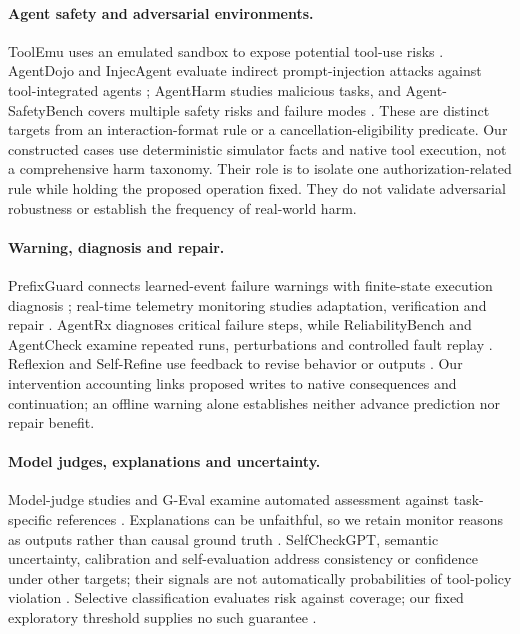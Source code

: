 \documentclass[10pt]{article}
\begin{document}
\paragraph{Agent safety and adversarial environments.}
ToolEmu uses an emulated sandbox to expose potential tool-use risks \citep{ruan2023toolemu}. AgentDojo and InjecAgent evaluate indirect prompt-injection attacks against tool-integrated agents \citep{debenedetti2024agentdojo,zhan2024injecagent}; AgentHarm studies malicious tasks, and Agent-SafetyBench covers multiple safety risks and failure modes \citep{andriushchenko2024agentharm,zhang2024agentsafety}. These are distinct targets from an interaction-format rule or a cancellation-eligibility predicate. Our constructed cases use deterministic simulator facts and native tool execution, not a comprehensive harm taxonomy. Their role is to isolate one authorization-related rule while holding the proposed operation fixed. They do not validate adversarial robustness or establish the frequency of real-world harm.

\paragraph{Warning, diagnosis and repair.}
PrefixGuard connects learned-event failure warnings with finite-state execution diagnosis \citep{huang2026prefix}; real-time telemetry monitoring studies adaptation, verification and repair \citep{dubey2026monitor}. AgentRx diagnoses critical failure steps, while ReliabilityBench and AgentCheck examine repeated runs, perturbations and controlled fault replay \citep{barke2026agentrx,reliability2026,mazumder2026agentcheck}. Reflexion and Self-Refine use feedback to revise behavior or outputs \citep{shinn2023reflexion,madaan2023selfrefine}. Our intervention accounting links proposed writes to native consequences and continuation; an offline warning alone establishes neither advance prediction nor repair benefit.

\paragraph{Model judges, explanations and uncertainty.}
Model-judge studies and G-Eval examine automated assessment against task-specific references \citep{zheng2023judge,liu2023geval}. Explanations can be unfaithful, so we retain monitor reasons as outputs rather than causal ground truth \citep{turpin2023unfaithful}. SelfCheckGPT, semantic uncertainty, calibration and self-evaluation address consistency or confidence under other targets; their signals are not automatically probabilities of tool-policy violation \citep{manakul2023selfcheck,kuhn2023semantic,guo2017calibration,kadavath2022know}. Selective classification evaluates risk against coverage; our fixed exploratory threshold supplies no such guarantee \citep{geifman2017selective}.
\end{document}
